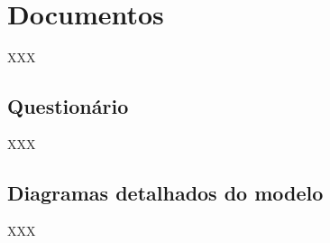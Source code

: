 
\chapter{Documentos}
\label{Appendice:Documentos}

XXX

\section{Questionário}

XXX

\newpage
\section{Diagramas detalhados do modelo}

XXX

